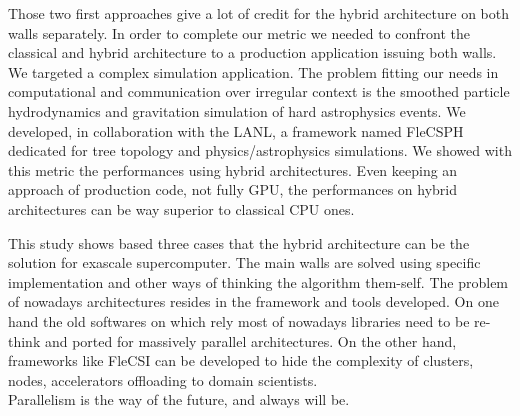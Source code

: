 Those two first approaches give a lot of credit for the hybrid architecture on both walls separately. 
In order to complete our metric we needed to confront the classical and hybrid architecture to a production application issuing both walls. 
We targeted a complex simulation application. 
The problem fitting our needs in computational and communication over irregular context is the smoothed particle hydrodynamics and gravitation simulation of hard astrophysics events. 
We developed, in collaboration with the LANL, a framework named FleCSPH dedicated for tree topology and physics/astrophysics simulations. 
We showed with this metric the performances using hybrid architectures. 
Even keeping an approach of production code, not fully GPU, the performances on hybrid architectures can be way superior to classical CPU ones. 

This study shows based three cases that the hybrid architecture can be the solution for exascale supercomputer.
The main walls are solved using specific implementation and other ways of thinking the algorithm them-self. 
The problem of nowadays architectures resides in the framework and tools developed. 
On one hand the old softwares on which rely most of nowadays libraries need to be re-think and ported for massively parallel architectures. 
On the other hand, frameworks like FleCSI can be developed to hide the complexity of clusters, nodes, accelerators offloading to domain scientists.\\

Parallelism is the way of the future, and always will be. 